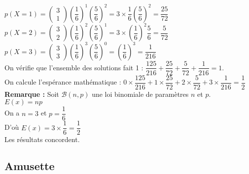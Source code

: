 $p\left(X = 1\right) = \left(\begin{array}{c} 3 \\ 1 \end{array}\right) \left(\dfrac{1}{6}\right)^1\left(\dfrac{5}{6}\right)^2 = 3 \times \dfrac{1}{6} \left(\dfrac{5}{6}\right)^2 = \dfrac{25}{72}$ \vspace*{.3cm} \\

$p\left(X = 2\right) = \left(\begin{array}{c} 3 \\ 2 \end{array}\right) \left(\dfrac{1}{6}\right)^2\left(\dfrac{5}{6}\right)^1 = 3 \times \left(\dfrac{1}{6}\right)^2 \dfrac{5}{6} = \dfrac{5}{72}$ \vspace*{.3cm} \\

$p\left(X = 3\right) = \left(\begin{array}{c} 3 \\ 3 \end{array}\right) \left(\dfrac{1}{6}\right)^3\left(\dfrac{5}{6}\right)^0 = \left(\dfrac{1}{6}\right)^3 = \dfrac{1}{216}$ \vspace*{.3cm} \\

On vérifie que l'ensemble des solutions fait 1 : $\dfrac{125}{216} + \dfrac{25}{72} + \dfrac{5}{72} + \dfrac{1}{216} = 1$. \\

On calcule l'espérance mathématique : $0 \times \dfrac{125}{216} + 1 \times \dfrac{25}{72} + 2 \times \dfrac{5}{72} + 3 \times \dfrac{1}{216} = \dfrac{1}{2}$ \\

\textbf{Remarque :} Soit $\mathcal{B} \left(n,p\right)$ une loi binomiale de paramètres $n$ et $p$. \\

$E(x) = np$ \\

On a $n = 3$ et $p = \dfrac{1}{6}$ \\

D'où $E(x) = 3 \times \dfrac{1}{6} = \dfrac{1}{2}$ \\

Les résultats concordent. 

\newpage

\subsection{Amusette}

